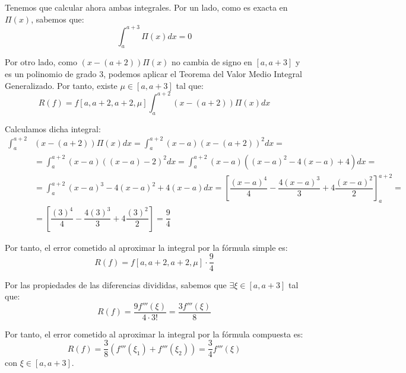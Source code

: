 \begin{ejercicio}
\begin{enumerate}
        Tenemos que calcular ahora ambas integrales. Por un lado, como es exacta en $\Pi(x)$, sabemos que:
        \begin{equation*}
            \int_{a}^{a+3} \Pi(x)dx = 0
        \end{equation*}

        Por otro lado, como $(x-(a+2))\Pi(x)$ no cambia de signo en $[a,a+3]$ y es un polinomio de grado $3$, podemos aplicar el Teorema del Valor Medio Integral Generalizado. Por tanto, existe $\mu\in [a,a+3]$ tal que:
        \begin{equation*}
            R(f) = f[a,a+2,a+2,\mu]\int_{a}^{a+2} (x-(a+2))\Pi(x)dx
        \end{equation*}

        Calculamos dicha integral:
        \begin{align*}
            \int_{a}^{a+2} &(x-(a+2))\Pi(x)dx = \int_{a}^{a+2} (x-a)(x-(a+2))^2dx
            =\\&= \int_{a}^{a+2} (x-a)((x-a)-2)^2dx
            = \int_{a}^{a+2} (x-a)((x-a)^2 - 4(x-a) + 4)dx
            =\\&= \int_{a}^{a+2} (x-a)^3 - 4(x-a)^2 + 4(x-a)dx
            = \left[\dfrac{(x-a)^4}{4} - \dfrac{4(x-a)^3}{3} + 4\dfrac{(x-a)^2}{2}\right]_{a}^{a+2}
            =\\&= \left[\dfrac{(3)^4}{4} - \dfrac{4(3)^3}{3} + 4\dfrac{(3)^2}{2}\right] = \dfrac{9}{4}
        \end{align*}
        
        Por tanto, el error cometido al aproximar la integral por la fórmula simple es:
        \begin{equation*}
            R(f) = f[a,a+2,a+2,\mu]\cdot \dfrac{9}{4}
        \end{equation*}

        Por las propiedades de las diferencias divididas, sabemos que $\exists \xi\in [a,a+3]$ tal que:
        \begin{equation*}
            R(f) = \dfrac{9f'''(\xi)}{4\cdot 3!} = \dfrac{3f'''(\xi)}{8}
        \end{equation*}

        Por tanto, el error cometido al aproximar la integral por la fórmula compuesta es:
        \begin{equation*}
            R(f) = \dfrac{3}{8}\left(f'''(\xi_1) + f'''(\xi_2)\right)
            = \dfrac{3}{4}f'''(\xi)
        \end{equation*}
        con $\xi\in [a,a+3]$.
    \end{enumerate}
\end{ejercicio}

